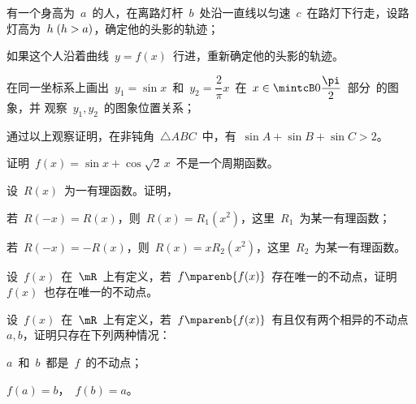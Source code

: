 \begin{exercise*}
\item\relax
\begin{exlist}
  \item 有一个身高为~$a$~的人，在离路灯杆~$b$~处沿一直线以匀速~$c$~在路灯下行走，设路灯高为~$h\mcond{h>a}$，确定他的头影的轨迹；
  \item 如果这个人沿着曲线~$y=f(x)$~行进，重新确定他的头影的轨迹。
\end{exlist}
\item\relax
\begin{exlist}
  \item 在同一坐标系上画出~$y_1=\sin x$~和~$y_2=\dfrac2\pi x$~在~$x\in\mintcB 0{\dfrac\pi2}$~部分~的图象，并
        观察~$y_1,y_2$~的图象位置关系；
  \item 通过以上观察证明，在非钝角~$\triangle\mathit{ABC}$~中，有~$\sin A+\sin B+\sin C>2$。
\end{exlist}
\item 证明~$f(x)=\sin x+\cos\sqrt 2\,x$~不是一个周期函数。
\item 设~$R(x)$~为一有理函数。证明，
\begin{exlist}
  \item 若~$R(-x)=R(x)$，则~$R(x)=R_1(x^2)$，这里~$R_1$~为某一有理函数；
  \item 若~$R(-x)=-R(x)$，则~$R(x)=x R_2(x^2)$，这里~$R_2$~为某一有理函数。
\end{exlist}
\item 设~$f(x)$~在~$\mR$~上有定义，若~$f\mparenb{f(x)}$~存在唯一的不动点，证明~$f(x)$~也存在唯一的不动点。
\item 设~$f(x)$~在~$\mR$~上有定义，若~$f\mparenb{f(x)}$~有且仅有两个相异的不动点~$a,b$，证明只存在下列两种情况：
\begin{exlistcols}
  \item $a$~和~$b$~都是~$f$~的不动点；
  \item $f(a)=b$，~$f(b)=a$。
\end{exlistcols}
\end{exercise*}




\endinput
